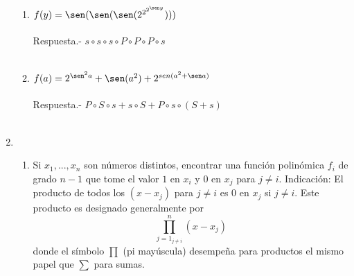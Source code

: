 \begin{enumerate}
\begin{enumerate}[\bfseries (i)]
	    \item $f(y) = \sen (\sen (\sen (2^{2^{2^{\sen y}}})))$\\\\
	    Respuesta.- \; $s \circ s \circ s \circ P \circ P \circ P \circ s$\\\\

	    \item $f(a)= 2^{\sen^2 a} +  \sen(a^2) + 2^{sen(a^2 + \sen a)}$\\\\
	    Respuesta.- \; $P \circ S \circ s  + s \circ S + P \circ s \circ (S + s)$\\\\

	\end{enumerate}

	\item 
	\begin{enumerate}[\bfseries (a)]

	    \item Si $x_1, ... , x_n$ son números distintos, encontrar una función polinómica $f_i$ de grado $n-1$ que tome el valor $1$ en $x_i$ y $0$ en $x_j$ para $j \neq i.$ Indicación: El producto de todos los $(x-x_j)$ para $j \neq i$ es $0$ en $x_j$ si $j \neq i.$ Este producto es designado generalmente por $$\prod\limits_{j=1_{j \neq i}}^n (x-x_j)$$ donde el símbolo $\prod$ (pi mayúscula) desempeña para productos el mismo papel que $\sum$ para sumas.\\\\


\end{enumerate}
\end{enumerate}
